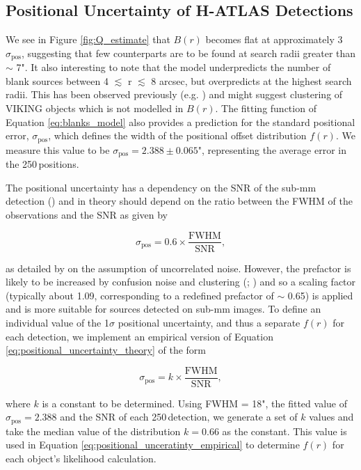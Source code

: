 \subsection{Positional Uncertainty of H-ATLAS Detections}

We see in Figure \ref{fig:Q_estimate} that $B(r)$ becomes flat at approximately 3$\sigma_{\textrm{pos}}$, suggesting that few counterparts are to be found at search radii greater than $\sim$ 7". It also interesting to note that the model underpredicts the number of blank sources between 4 $\lesssim$ r $\lesssim$ 8 arcsec, but overpredicts at the highest search radii. This has been observed previously (e.g. \citealt{Fleuren_2012}) and might suggest clustering of VIKING objects which is not modelled in $B(r)$. The fitting function of Equation \ref{eq:blanks_model} also provides a prediction for the standard positional error, $\sigma_{\textrm{pos}}$, which defines the width of the positional offset distribution $f(r)$. We measure this value to be $\sigma_{\textrm{pos}} = 2.388\pm0.065$", representing the average error in the 250\,\micron positions.

The positional uncertainty has a dependency on the SNR of the sub-mm detection (\citealt{Bourne_2016}) and in theory should depend on the ratio between the FWHM of the observations and the SNR as given by

\begin{equation}
    \sigma_{\textrm{pos}} = 0.6\times\frac{\textrm{FWHM}}{\textrm{SNR}},
\label{eq:positional_uncertainty_theory}
\end{equation}

as detailed by \citealt{Ivison_2007} on the assumption of uncorrelated noise. However, the prefactor is likely to be increased by confusion noise and clustering (\citealt{Chapin_2011}; \citealt{Bourne_2014}) and so a scaling factor (typically about 1.09, corresponding to a redefined prefactor of $\sim$ 0.65) is applied and is more suitable for sources detected on sub-mm images. To define an individual value of the 1$\sigma$ positional uncertainty, and thus a separate $f(r)$ for each detection, we implement an empirical version of Equation \ref{eq:positional_uncertainty_theory} of the form

\begin{equation}
    \sigma_{\textrm{pos}} = k\times\frac{\textrm{FWHM}}{\textrm{SNR}},
\label{eq:positional_unceratinty_empirical}
\end{equation}

where $k$ is a constant to be determined. Using FWHM = 18", the fitted value of $\sigma_{\textrm{pos}} = 2.388$ and the SNR of each 250\,\micron detection, we generate a set of $k$ values and take the median value of the distribution $k = 0.66$ as the constant. This value is used in Equation \ref{eq:positional_unceratinty_empirical} to determine $f(r)$ for each object's likelihood calculation.

